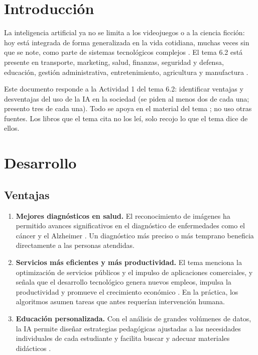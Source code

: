 \documentclass[11pt,letterpaper]{article}
\begin{document}
\portada
\indicegeneral

\section{Introducción}

La inteligencia artificial ya no se limita a los videojuegos o a la ciencia ficción: hoy está integrada de forma generalizada en la vida cotidiana, muchas veces sin que se note, como parte de sistemas tecnológicos complejos \parencite{iae_u6_t62}. El tema 6.2 está presente en transporte, marketing, salud, finanzas, seguridad y defensa, educación, gestión administrativa, entretenimiento, agricultura y manufactura \parencite{iae_u6_t62}.

Este documento responde a la Actividad 1 del tema 6.2: identificar ventajas y desventajas del uso de la IA en la sociedad (se piden al menos dos de cada una; presento tres de cada una). Todo se apoya en el material del tema \parencite{iae_u6_t62}; no uso otras fuentes. Los libros que el tema cita no los leí, solo recojo lo que el tema dice de ellos.

\section{Desarrollo}

\subsection{Ventajas}

\begin{enumerate}
    \item \textbf{Mejores diagnósticos en salud.} El reconocimiento de imágenes ha permitido avances significativos en el diagnóstico de enfermedades como el cáncer y el Alzheimer \parencite{iae_u6_t62}. Un diagnóstico más preciso o más temprano beneficia directamente a las personas atendidas.
    \item \textbf{Servicios más eficientes y más productividad.} El tema menciona la optimización de servicios públicos y el impulso de aplicaciones comerciales, y señala que el desarrollo tecnológico genera nuevos empleos, impulsa la productividad y promueve el crecimiento económico \parencite{iae_u6_t62}. En la práctica, los algoritmos asumen tareas que antes requerían intervención humana.
    \item \textbf{Educación personalizada.} Con el análisis de grandes volúmenes de datos, la IA permite diseñar estrategias pedagógicas ajustadas a las necesidades individuales de cada estudiante y facilita buscar y adecuar materiales didácticos \parencite{iae_u6_t62}.
\end{enumerate}
\end{document}
